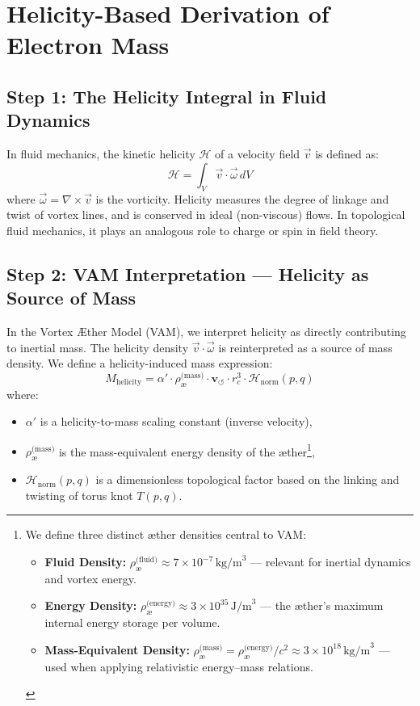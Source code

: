 \section{Helicity-Based Derivation of Electron Mass}

\subsection*{Step 1: The Helicity Integral in Fluid Dynamics}

In fluid mechanics, the kinetic helicity \( \mathcal{H} \) of a velocity field \( \vec{v} \) is defined as:
\[
\boxed{
\mathcal{H} = \int_V \vec{v} \cdot \vec{\omega} \, dV
}
\tag{1}
\]
where \( \vec{\omega} = \nabla \times \vec{v} \) is the vorticity. Helicity measures the degree of linkage and twist of vortex lines, and is conserved in ideal (non-viscous) flows. In topological fluid mechanics, it plays an analogous role to charge or spin in field theory.

\subsection*{Step 2: VAM Interpretation — Helicity as Source of Mass}

In the Vortex Æther Model (VAM), we interpret helicity as directly contributing to inertial mass. The helicity density \( \vec{v} \cdot \vec{\omega} \) is reinterpreted as a source of mass density. We define a helicity-induced mass expression:
\[
M_{\text{helicity}} = \alpha' \cdot \rho_\text{\ae}^{\text{(mass)}} \cdot \mathbf{v}_{\scriptscriptstyle\boldsymbol{\circlearrowleft}} \cdot r_c^3 \cdot \mathcal{H}_{\text{norm}}(p,q)
\tag{2}
\]
where:
\begin{itemize}
    \item \( \alpha' \) is a helicity-to-mass scaling constant (inverse velocity),
    \item \( \rho_\text{\ae}^{\text{(mass)}} \) is the mass-equivalent energy density of the æther\footnote{We define three distinct æther densities central to VAM:

\begin{itemize}
    \item \textbf{Fluid Density:} \( \rho_\text{\ae}^{\text{(fluid)}} \approx 7 \times 10^{-7} \, \text{kg/m}^3 \) — relevant for inertial dynamics and vortex energy.
    \item \textbf{Energy Density:} \( \rho_\text{\ae}^{\text{(energy)}} \approx 3 \times 10^{35} \, \text{J/m}^3 \) — the æther’s maximum internal energy storage per volume.
    \item \textbf{Mass-Equivalent Density:} \( \rho_\text{\ae}^{\text{(mass)}} = \rho_\text{\ae}^{\text{(energy)}} / c^2 \approx 3 \times 10^{18} \, \text{kg/m}^3 \) — used when applying relativistic energy–mass relations.
\end{itemize}
},
    \item \( \mathcal{H}_{\text{norm}}(p,q) \) is a dimensionless topological factor based on the linking and twisting of torus knot \( T(p,q) \).
\end{itemize}

